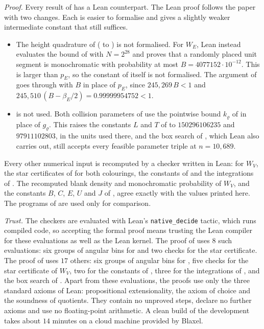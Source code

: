 \documentclass[11pt,colorlinks]{charlie}
\begin{document}
\emph{Proof.} Every result of  has a Lean counterpart. The Lean proof follows the paper with two changes. Each is easier to formalise and gives a slightly weaker intermediate constant that still suffices.
\begin{itemize}\small
\item The height quadrature of  ( to ) is not formalised. For $W_E$, Lean instead evaluates the bound of  with $N=2^{28}$ and proves that a randomly placed unit segment is monochromatic with probability at most $B=4077152\cdot10^{-12}$. This is larger than $p_E$, so the constant of  itself is not formalised. The argument of  goes through with $B$ in place of $p_E$, since $245{,}269\,B<1$ and $245{,}510\,(B-\beta_E/2)=0.99999954752<1$.
\item {} is not used. Both collision parameters of  use the pointwise bound $k_\varrho$ of  in place of $g_\varrho$. This raises the constants $L$ and $T$ of  to $150296106235$ and $97911102803$, in the units used there, and the box search of , which Lean also carries out, still accepts every feasible parameter triple at $n=10{,}689$.
\end{itemize}
Every other numerical input is recomputed by a checker written in Lean:  for $W_V$, the star certificates of  for both colourings, the constants of  and the integrations of . The recomputed blank density and monochromatic probability of $W_V$, and the constants $B$, $C$, $E$, $U$ and $J$ of , agree exactly with the values printed here. The programs of  are used only for comparison.

\emph{Trust.} The checkers are evaluated with Lean's \texttt{native\_decide} tactic, which runs compiled code, so accepting the formal proof means trusting the Lean compiler for these evaluations as well as the Lean kernel. The proof of  uses $8$ such evaluations: six groups of angular bins for  and two checks for the star certificate. The proof of  uses $17$ others: six groups of angular bins for , five checks for the star certificate of $W_V$, two for the constants of , three for the integrations of , and the box search of . Apart from these evaluations, the proofs use only the three standard axioms of Lean: propositional extensionality, the axiom of choice and the soundness of quotients. They contain no unproved steps, declare no further axioms and use no floating-point arithmetic. A clean build of the development takes about $14$ minutes on a cloud machine provided by Blaxel.
\end{document}
